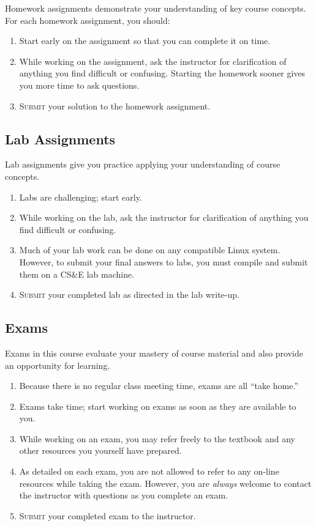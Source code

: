 \documentclass[11pt]{article}
\newcommand{\submit}{\textsc{Submit}}
\begin{document}
Homework assignments
demonstrate your understanding of key course concepts.
For each homework assignment, you should:
\begin{enumerate}
\item
  Start early on the assignment so that you can complete it on time.
\item
  While working on the assignment,
  ask the instructor for clarification of anything you find
  difficult or confusing.
  Starting the homework sooner gives you more time to ask questions.
\item
  \submit{} your solution to the homework assignment.
\end{enumerate}

\subsection{Lab Assignments}

Lab assignments
give you practice applying your understanding of course concepts.
\begin{enumerate}
\item
  Labs are challenging; start early.
\item
  While working on the lab,
  ask the instructor for clarification of anything you find
  difficult or confusing.
\item
  Much of your lab work can be done on any compatible Linux system.
  However, to submit your final answers to labs,
  you must compile and submit them on a CS\&E lab machine.
\item
  \submit{} your completed lab as directed in the lab write-up.
\end{enumerate}

\subsection{Exams}

Exams in this course evaluate your mastery of course material
and also provide an opportunity for learning.
\begin{enumerate}
\item
  Because there is no regular class meeting time,
  exams are all ``take home.''
\item
  Exams take time;
  start working on exams as soon as they are available to you.
\item
  While working on an exam,
  you may refer freely to the textbook
  and any other resources you yourself have prepared.
\item
  As detailed on each exam,
  you are not allowed to refer to any
  on-line resources
  while taking the exam.
  However, you are \emph{always} welcome to contact the instructor
  with questions as you complete an exam.
\item
  \submit{} your completed exam to the instructor.
\end{enumerate}
\end{document}
